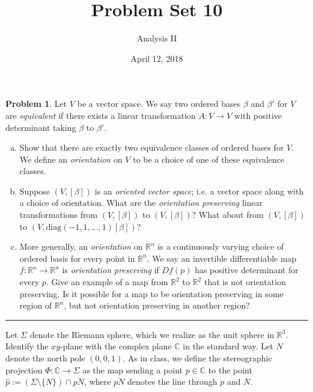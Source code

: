 \documentclass{amsart}
\newcommand{\+}[1]{\ensuremath{\mathbf{#1}}}
\newcommand{\C}{{\mathbb C}}
\newcommand{\R}{{\mathbb R}}
\theoremstyle{definition}
\newtheorem{prob}{Problem}
\begin{document}
\title{Problem Set 10}
\date{April 12, 2018}
\author{Analysis II}

\maketitle


\begin{prob}
 Let $V$ be a vector space.  We say two ordered bases $\beta$ and $\beta'$ for $V$ are \emph{equivalent} if there exists
 a linear transformation $A:V \to V$ with positive determinant taking $\beta$ to $\beta'$.
 \begin{enumerate}[(a)]
  \item Show that there are exactly two equivalence classes of ordered bases for $V$.
  We define an \emph{orientation} on $V$ to be a choice of one of these equivalence classes.
  \item Suppose $(V,[\beta])$ is an \emph{oriented vector space}; i.e. a vector space along with a choice of orientation.
  What are the \emph{orientation preserving} linear transformations from $(V,[\beta])$ to $(V,[\beta])$? What about from
  $(V, [\beta])$ to $(V, \text{diag}(-1,1,\ldots,1)[\beta])$?
  \item More generally, an \emph{orientation} on $\R^n$ is a continuously varying choice of 
  ordered basis for every point in $\R^n$.  We say an invertible differentiable map $f: \R^n \to \R^n$ is \emph{orientation preserving} if $Df(p)$
  has positive determinant for every $p$.
  Give an example of a map from $\R^2$ to $\R^2$ that is not orientation preserving.  Is it possible for a map to be
  orientation preserving in some region of $\R^n$, but not orientation preserving in another region?  
 \end{enumerate}
\end{prob}

\vspace{5mm}

\hrule

\vspace{5mm}


 Let $\Sigma$ denote the Riemann sphere, which we realize as the unit sphere in $\R^3$.  Identify the $xy$-plane with
 the complex plane $\C$ in the standard way.  Let $N$ denote the north pole $(0,0,1)$.
 As in class, we define the stereographic projection $\Phi: \C \to \Sigma$ as the map sending a point $p \in \C$
 to the point $\hat{p} := (\Sigma \setminus \{N\}) \cap \overline{pN}$, where $\overline{pN}$ denotes the line through $p$ and $N$.
 
\end{document}
